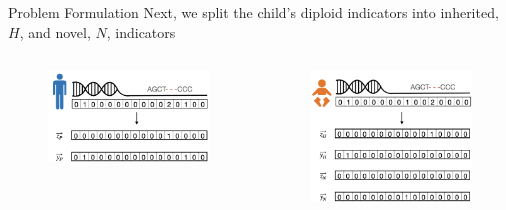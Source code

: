\documentclass[10pt, t]{beamer}
\begin{document}
\begin{frame}{Problem Formulation}
	Next, we split the child's diploid indicators into inherited, $H$, and novel, $N$, indicators 
	{\begin{center}
			\begin{columns}
				\begin{column}{0.49\textwidth}
					\begin{figure}
						\includegraphics[width=.9\linewidth]{imgs/parent_z_y.png}
					\end{figure}
				\end{column}
				\begin{column}{0.49\textwidth}
					\vspace{-5mm}
					\begin{figure}
						\includegraphics[width=.9\linewidth]{imgs/child_z_y_all.png}
					\end{figure}
				\end{column}
			\end{columns}
	\end{center}}
\end{frame}
\end{document}
